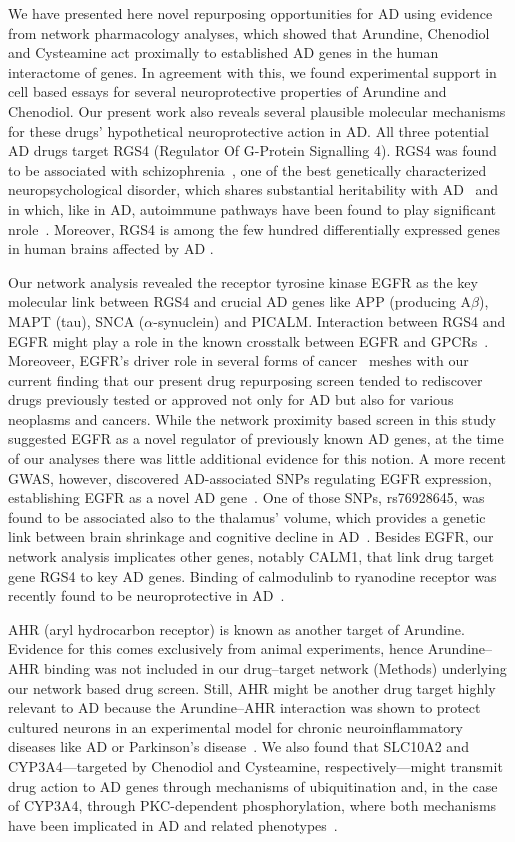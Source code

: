 \documentclass[letterpaper]{article}
\begin{document}
We have presented here novel repurposing opportunities for AD using evidence
from network pharmacology analyses, which showed that Arundine, Chenodiol and
Cysteamine act proximally to established AD genes in the human interactome of
genes.  In agreement with this, we found experimental support in cell based
essays for several neuroprotective properties of Arundine and Chenodiol.  Our
present work also reveals several plausible molecular mechanisms for these
drugs' hypothetical neuroprotective action in AD.  All three potential AD drugs
target RGS4 (Regulator Of G-Protein Signalling 4).  RGS4 was found to be
associated with schizophrenia~\citep{Chowdari2002}, one of the best
genetically characterized neuropsychological disorder, which shares
substantial heritability with AD~\citep{Consortium2018} and in which, like in
AD, autoimmune pathways have been found to play significant
nrole~\citep{Sekar2016a}.  Moreover, RGS4 is among the few hundred
differentially expressed genes in human brains affected by AD
\cite{Taubes2021}.

Our network analysis revealed the receptor tyrosine kinase EGFR as the key
molecular link between RGS4 and crucial AD genes like APP (producing
A$\beta$), MAPT (tau), SNCA ($\alpha$-synuclein) and PICALM.
Interaction between RGS4 and EGFR might play a role in the known crosstalk
between EGFR and GPCRs~\cite{Wang2016c}.  Moreoveer, EGFR's driver role in
several forms of cancer~\cite{Sigismund2018} meshes with our current finding
that our present drug repurposing screen tended to rediscover drugs previously
tested or approved not only for AD but also for various neoplasms and cancers.
While the network proximity based screen in this study suggested EGFR as a
novel regulator of previously known AD genes, at the time of our analyses
there was little additional evidence for this notion.  A more recent GWAS,
however, discovered AD-associated SNPs regulating EGFR expression,
establishing EGFR as a novel AD gene~\cite{Bellenguez2022}.  One of those
SNPs, rs76928645, was found to be associated also to the thalamus' volume,
which provides a genetic link between brain shrinkage and cognitive decline in
AD~\cite{Elvsaashagen2021}.  Besides EGFR, our network analysis implicates
other genes, notably CALM1, that link drug target gene RGS4 to key AD genes.
Binding of calmodulinb to ryanodine receptor was recently found to be
neuroprotective in AD~\cite{Nakamura2021}.

AHR (aryl hydrocarbon receptor) is known as another target of Arundine.
Evidence for this comes exclusively from animal experiments, hence
Arundine--AHR binding was not included in our drug--target network (Methods)
underlying our network based drug screen.  Still, AHR might be another drug
target highly relevant to AD because the Arundine--AHR interaction was shown
to protect cultured neurons in an experimental model for chronic
neuroinflammatory diseases like AD or Parkinson's
disease~\cite{Rzemieniec2019}.  We also found that SLC10A2 and
CYP3A4---targeted by Chenodiol and Cysteamine, respectively---might transmit
drug action to AD genes through mechanisms of ubiquitination and, in the case
of CYP3A4, through PKC-dependent phosphorylation, where both mechanisms have
been implicated in AD and related
phenotypes~\cite{Reis2022,Hegde2019,Alfonso2016}.
\end{document}
